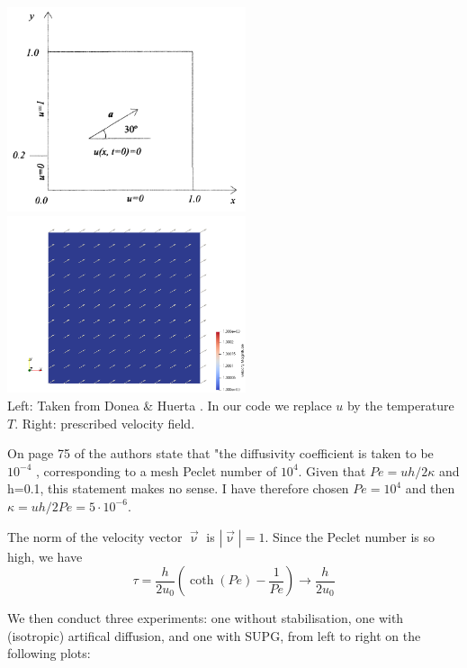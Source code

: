 \begin{center}
\includegraphics[width=7cm]{python_codes/fieldstone_65/images/setup}
\includegraphics[width=7cm]{python_codes/fieldstone_65/results/exp2/vel}\\
{\captionfont Left: Taken from Donea \& Huerta \cite{dohu03}. In our code we replace $u$ by the 
temperature $T$. Right: prescribed velocity field.}
\end{center}

\begin{remark}
On page 75 of \cite{dohu03} the authors state that 
"the diffusivity coefficient is taken to be $10^{-4}$ , 
corresponding to a mesh Peclet number of $10^4$. 
Given that $Pe=u h/2\kappa$ and h=0.1, this statement makes no sense.
I have therefore chosen $Pe=10^4$ and then 
$\kappa=uh/2Pe = 5\cdot10^{-6}$.
\end{remark}

The norm of the velocity vector $\vec{\upnu}$ is $|\vec{\upnu}|=1$. 
Since the Peclet number is so high, we have 
\[
\tau = \frac{h}{2 u_0} \left( \coth (Pe) -\frac{1}{Pe} \right) \rightarrow 
\frac{h}{2 u_0} 
\]

We then conduct three experiments: one without stabilisation, one with (isotropic) artifical diffusion, and 
one with SUPG, from left to right on the following plots:

